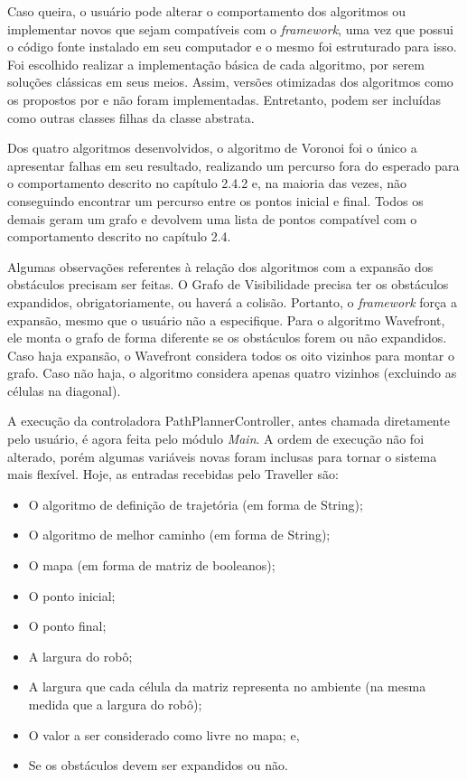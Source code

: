 Caso queira, o usuário pode alterar o comportamento dos algoritmos ou implementar novos que sejam compatíveis com o \textit{framework}, uma vez que possui o código fonte instalado em seu computador e o mesmo foi estruturado para isso. Foi escolhido realizar a implementação básica de cada algoritmo, por serem soluções clássicas em seus meios. Assim, versões otimizadas dos algoritmos como os propostos por \cite{Souza2008} e \cite{Medeiros2011} não foram implementadas. Entretanto, podem ser incluídas como outras classes filhas da classe abstrata.

Dos quatro algoritmos desenvolvidos, o algoritmo de Voronoi foi o único a apresentar falhas em seu resultado, realizando um percurso fora do esperado para o comportamento descrito no capítulo 2.4.2 e, na maioria das vezes, não conseguindo encontrar um percurso entre os pontos inicial e final. Todos os demais geram um grafo e devolvem uma lista de pontos compatível com o comportamento descrito no capítulo 2.4.

Algumas observações referentes à relação dos algoritmos com a expansão dos obstáculos precisam ser feitas. O Grafo de Visibilidade precisa ter os obstáculos expandidos, obrigatoriamente, ou haverá a colisão. Portanto, o \textit{framework} força a expansão, mesmo que o usuário não a especifique. Para o algoritmo Wavefront, ele monta o grafo de forma diferente se os obstáculos forem ou não expandidos. Caso haja expansão, o Wavefront considera todos os oito vizinhos para montar o grafo. Caso não haja, o algoritmo considera apenas quatro vizinhos (excluindo as células na diagonal).

A execução da controladora PathPlannerController, antes chamada diretamente pelo usuário, é agora feita pelo módulo \textit{Main}. A ordem de execução não foi alterado, porém algumas variáveis novas foram inclusas para tornar o sistema mais flexível. Hoje, as entradas recebidas pelo Traveller são:

\begin{itemize}
  \item O algoritmo de definição de trajetória (em forma de String);
  \item O algoritmo de melhor caminho (em forma de String);
  \item O mapa (em forma de matriz de booleanos);
  \item O ponto inicial;
  \item O ponto final;
  \item A largura do robô;
  \item A largura que cada célula da matriz representa no ambiente (na mesma medida que a largura do robô);
  \item O valor a ser considerado como livre no mapa; e,
  \item Se os obstáculos devem ser expandidos ou não.
\end{itemize}


